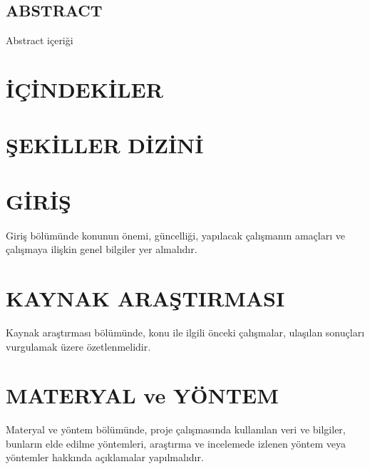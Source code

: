 \documentclass[hidelinks,12pt]{article}
\makeatletter
\renewcommand\tableofcontents{%
    \@starttoc{toc}%
}
\makeatother
\begin{document}
\newpage

\begin{center}
\section*{\centering ABSTRACT}
\end{center}
\quad Abstract içeriği

\newpage

\newpage
\thispagestyle{empty}
    \section*{\centering İÇİNDEKİLER}
    \tableofcontents
\newpage

\section*{\centering ŞEKİLLER DİZİNİ}
\listoffigures
\newpage

\section{GİRİŞ}

Giriş bölümünde konunun önemi, güncelliği, yapılacak çalışmanın amaçları ve
çalışmaya ilişkin genel bilgiler yer almalıdır.
\newpage

\section{KAYNAK ARAŞTIRMASI}

Kaynak araştırması bölümünde, konu ile
ilgili önceki çalışmalar, ulaşılan sonuçları vurgulamak üzere özetlenmelidir.
\newpage

\section{MATERYAL ve YÖNTEM}

Materyal
ve yöntem bölümünde, proje çalışmasında kullanılan veri ve bilgiler, bunların elde
edilme yöntemleri, araştırma ve incelemede izlenen yöntem veya yöntemler hakkında
açıklamalar yapılmalıdır.
\newpage

\end{document}
